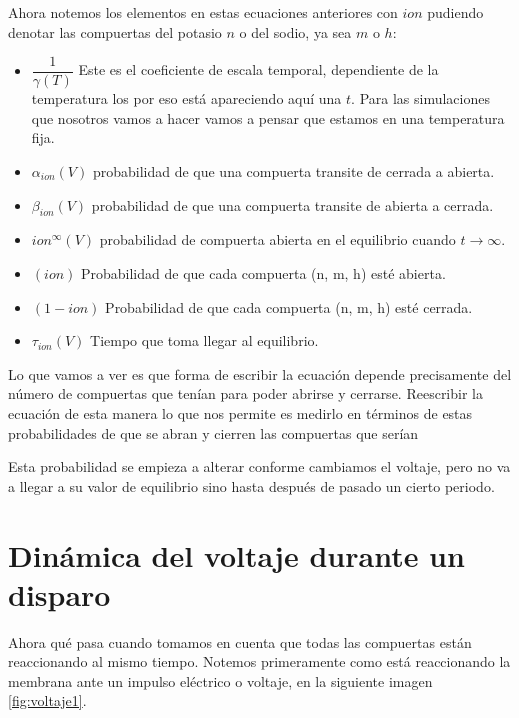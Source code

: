 Ahora notemos los elementos en estas ecuaciones anteriores con \(ion\) pudiendo denotar las compuertas del potasio \(n\) o del sodio, ya sea \(m\) o \(h\):
\begin{itemize}
 \item \(\dfrac{1}{\gamma(T)}\) Este es el coeficiente de escala temporal, dependiente de la temperatura los por eso está apareciendo aquí una \(t\). Para las simulaciones que nosotros vamos a hacer vamos a pensar que estamos en una temperatura fija. 
 \item \(\alpha_{ion}(V)\) probabilidad de que una compuerta transite de cerrada a abierta.
 \item \(\beta_{ion}(V)\) probabilidad de que una compuerta transite de abierta a cerrada.
 \item \(ion^\infty(V)\) probabilidad de compuerta abierta en el equilibrio cuando \(t \rightarrow \infty\).
 \item \((ion)\) Probabilidad de que cada compuerta (n, m, h) esté abierta.
 \item \((1-ion)\) Probabilidad de que cada compuerta (n, m, h) esté cerrada.
 
 \item \(\tau_{ion}(V)\) Tiempo que toma llegar al equilibrio.
\end{itemize}


Lo que vamos a ver es que forma de escribir la ecuación depende precisamente del número de compuertas que tenían para poder abrirse y cerrarse. Reescribir la ecuación de esta manera lo que nos permite es medirlo en términos de estas probabilidades de que se abran y cierren las compuertas que serían 

Esta probabilidad se empieza a alterar conforme cambiamos el voltaje, pero no va a llegar a su valor de equilibrio sino hasta después de pasado un cierto periodo.


\section{Dinámica del voltaje durante un disparo} 

Ahora qué pasa cuando tomamos en cuenta que todas las compuertas están reaccionando al mismo tiempo.
Notemos primeramente como está reaccionando la membrana ante un impulso eléctrico o voltaje, en la siguiente imagen \ref{fig:voltaje1}.

